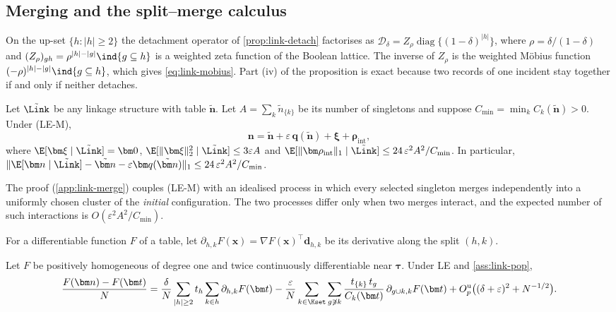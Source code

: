 \subsection{Merging and the split--merge calculus}\label{app:link-opdetails}

On the up-set $\{h:|h|\ge2\}$ the detachment operator of \cref{prop:link-detach} factorises as $\mathcal D_\delta=Z_\rho\operatorname{diag}\{(1-\delta)^{|h|}\}$, where $\rho=\delta/(1-\delta)$ and $(Z_\rho)_{gh}=\rho^{|h|-|g|}\ind{g\subseteq h}$ is a weighted zeta function of the Boolean lattice. The inverse of $Z_\rho$ is the weighted Möbius function $(-\rho)^{|h|-|g|}\ind{g\subseteq h}$, which gives \eqref{eq:link-mobius}. Part (iv) of the proposition is exact because two records of one incident stay together if and only if neither detaches.

\begin{lemma}\label{lem:link-merge}
Let $\tilde\Link$ be any linkage structure with table $\tilde{\bm n}$. Let $A=\sum_k\tilde n_{\{k\}}$ be its number of singletons and suppose $C_{\min}=\min_kC_k(\tilde{\bm n})>0$. Under (LE-M),
\[
  \bm n=\tilde{\bm n}+\varepsilon\,\bm q(\tilde{\bm n})+\bm\xi+\bm\rho_{\mathrm{int}},
\]
where $\E[\bm\xi\mid\tilde\Link]=\bm 0$, $\E[\|\bm\xi\|_2^2\mid\tilde\Link]\le3\varepsilon A$ and $\E[\|\bm\rho_{\mathrm{int}}\|_1\mid\tilde\Link]\le24\,\varepsilon^2A^2/C_{\min}$. In particular, $\|\E[\bm n\mid\tilde\Link]-\tilde{\bm n}-\varepsilon\bm q(\tilde{\bm n})\|_1\le24\,\varepsilon^2A^2/C_{\min}$.
\end{lemma}

The proof (\cref{app:link-merge}) couples (LE-M) with an idealised process in which every selected singleton merges independently into a uniformly chosen cluster of the \emph{initial} configuration. The two processes differ only when two merges interact, and the expected number of such interactions is $O(\varepsilon^2A^2/C_{\min})$.

For a differentiable function $F$ of a table, let $\partial_{h,k}F(\bm x)=\nabla F(\bm x)^{\top}\bm d_{h,k}$ be its derivative along the split $(h,k)$.

\begin{lemma}\label{lem:link-response}
Let $F$ be positively homogeneous of degree one and twice continuously differentiable near $\bm\tau$. Under LE and \cref{ass:link-pop},
\begin{equation}\label{eq:link-response}
  \frac{F(\bm n)-F(\bm t)}{N}
  =\frac{\delta}{N}\sum_{|h|\ge2}t_h\sum_{k\in h}\partial_{h,k}F(\bm t)
  -\frac{\varepsilon}{N}\sum_{k\in\Kset}\sum_{g\not\ni k}\frac{t_{\{k\}}\,t_g}{C_k(\bm t)}\,\partial_{g\cup k,k}F(\bm t)
  +O_p^{\mathrm u}\bigl((\delta+\varepsilon)^2+N^{-1/2}\bigr).
\end{equation}
\end{lemma}

